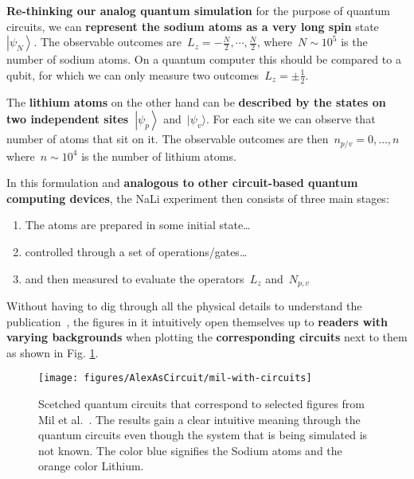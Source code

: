 \documentclass[%
 reprint,
 amsmath,amssymb,
 aps,
]{revtex4-1}
\providecommand{\tightlist}{\setlength{\itemsep}{0pt}\setlength{\parskip}{0pt}}%
\begin{document}
\textbf{Re-thinking our analog quantum simulation} for the purpose of
quantum circuits, we can \textbf{represent the sodium atoms as a very
long spin} state~\(\left|\psi_N\right\rangle\). The observable outcomes
are~\(L_z=-\frac{N}{2},\cdots,\frac{N}{2}\), where~\(N\sim10^5\) is the number of sodium
atoms. On a quantum computer this should be compared to a qubit, for
which we can only measure two outcomes~\(L_z=\pm\frac{1}{2}\).

The \textbf{lithium atoms} on the other hand can be \textbf{described by
the states on two independent sites~}\(\left|\psi_p\right\rangle\)
and~\(|\psi_v\rangle\). For each site we can observe that number of
atoms that sit on it. The observable outcomes are
then~\(n_{p/v} = 0, \dots, n\) where~\(n\sim 10^4\) is the number of
lithium atoms.~

\par\null

In this formulation and \textbf{analogous to other circuit-based quantum
computing devices}, the NaLi experiment then consists of three main
stages:

\begin{enumerate}
\tightlist
\item
  The atoms are prepared in some initial state\ldots{}
\item
  controlled through a set of operations/gates\ldots{}
\item
  and then measured to evaluate the operators~\(L_z\)
  and~\(N_{p,v}\)
\end{enumerate}

Without having to dig through all the physical details to understand the
publication~\cite{Mil2020}, the figures in it intuitively open
themselves up to \textbf{readers with varying backgrounds} when plotting
the \textbf{corresponding circuits} next to them as shown in Fig.
{\ref{428832}}.
\begin{figure}[h!]
\begin{center}
\texttt{[image: figures/AlexAsCircuit/mil-with-circuits]}
\caption{{Scetched quantum circuits that correspond to selected figures from Mil
et al.~\protect\cite{Mil2020}. The results gain a clear intuitive meaning
through the quantum circuits even though the system that is being
simulated is not known. The color blue signifies the Sodium atoms and
the orange color Lithium.
{\label{428832}}%
}}
\end{center}
\end{figure}
\end{document}
